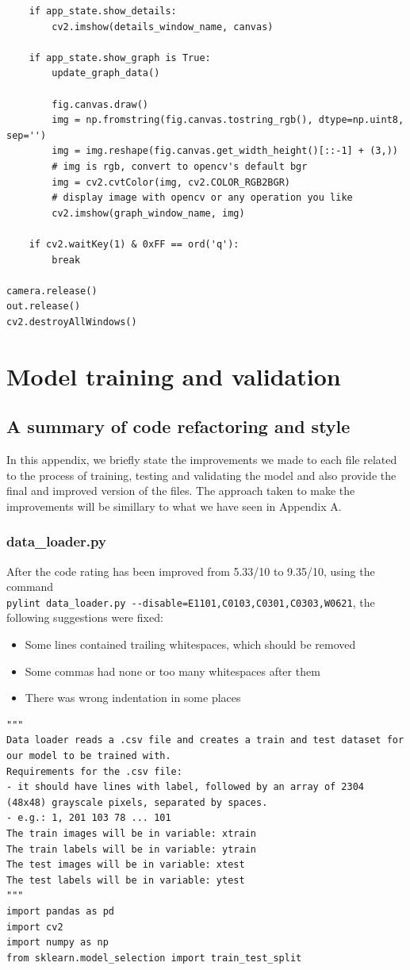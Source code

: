 \documentclass[runningheads,a4paper,11pt]{report}
\begin{document}
\begin{appendices}
\begin{lstlisting}
    if app_state.show_details:
        cv2.imshow(details_window_name, canvas)
    
    if app_state.show_graph is True:
        update_graph_data()

        fig.canvas.draw()
        img = np.fromstring(fig.canvas.tostring_rgb(), dtype=np.uint8, sep='')
        img = img.reshape(fig.canvas.get_width_height()[::-1] + (3,))
        # img is rgb, convert to opencv's default bgr
        img = cv2.cvtColor(img, cv2.COLOR_RGB2BGR)
        # display image with opencv or any operation you like
        cv2.imshow(graph_window_name, img)

    if cv2.waitKey(1) & 0xFF == ord('q'):
        break

camera.release()
out.release()
cv2.destroyAllWindows()
\end{lstlisting}

\clearpage
\chapter{Model training and validation}
\section{A summary of code refactoring and style}
In this appendix, we briefly state the improvements we made to each file related to the process of training, testing and validating the model and also provide the final and improved version of the files. The approach taken to make the improvements will be simillary to what we have seen in Appendix A.

\subsection{data\_loader.py}
After the code rating has been improved from 5.33/10 to 9.35/10, using the command \\
\verb|pylint data_loader.py --disable=E1101,C0103,C0301,C0303,W0621|, the following suggestions were fixed:
\begin{itemize}
	\item Some lines contained trailing whitespaces, which should be removed
	\item Some commas had none or too many whitespaces after them
	\item There was wrong indentation in some places
\end{itemize}
\begin{lstlisting}
"""
Data loader reads a .csv file and creates a train and test dataset for our model to be trained with.
Requirements for the .csv file:
- it should have lines with label, followed by an array of 2304 (48x48) grayscale pixels, separated by spaces.
- e.g.: 1, 201 103 78 ... 101
The train images will be in variable: xtrain
The train labels will be in variable: ytrain
The test images will be in variable: xtest
The test labels will be in variable: ytest
"""
import pandas as pd
import cv2
import numpy as np
from sklearn.model_selection import train_test_split


\end{lstlisting}
\end{appendices}
\end{document}
